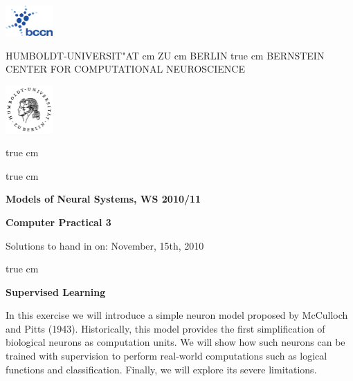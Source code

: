 \documentclass[12pt, a4]{article}
\begin{document}
\parbox{2cm}{
\includegraphics[width=1.8cm]{bccnlogo}
}
\parbox{11cm}{
\begin{center}
\large HUMBOLDT-UNIVERSIT"AT  cm ZU  cm BERLIN
 true cm
\mgross BERNSTEIN CENTER FOR COMPUTATIONAL NEUROSCIENCE
\end{center}
}
\parbox{2cm}
{
\hfill
\includegraphics[width=1.8cm]{hublogo}
}

 true cm




 true cm
\centerline{\bf Models of Neural Systems, WS 2010/11}
\centerline{\bf Computer Practical 3}
\centerline{Solutions to hand in on: November, 15th, 2010}

 true cm

{\bf Supervised Learning}

\medskip

In this exercise we will introduce  a simple neuron model proposed by
McCulloch and Pitts (1943). Historically, this model provides the first
simplification of biological neurons as computation units. We will
show how such neurons can be trained with supervision to perform
real-world computations such as logical functions and classification.
Finally, we will explore its severe limitations. 

\end{document}

